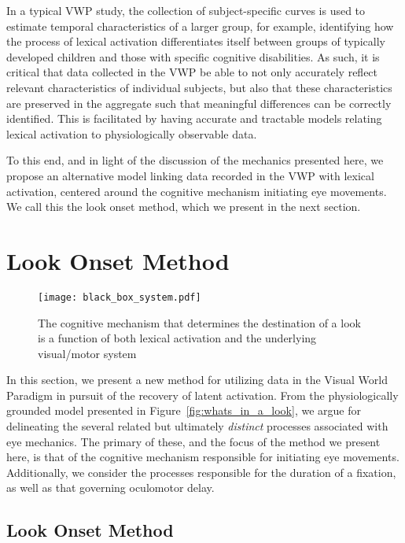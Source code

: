 In a typical VWP study, the collection of subject-specific curves is used to estimate temporal characteristics of a larger group, for example, identifying how the process of lexical activation differentiates itself between groups of typically developed children and those with specific cognitive disabilities. As such, it is critical that data collected in the VWP be able to not only accurately reflect relevant characteristics of individual subjects, but also that these characteristics are preserved in the aggregate such that meaningful differences can be correctly identified. This is facilitated by having accurate and tractable models relating lexical activation to physiologically observable data. 

To this end, and in light of the discussion of the mechanics presented here, we propose an alternative model linking data recorded in the VWP with lexical activation, centered around the cognitive mechanism initiating eye movements. We call this the look onset method, which we present in the next section.




\section{Look Onset Method}

\begin{figure}[H]
\centering
\texttt{[image: black\_box\_system.pdf]}
\caption{The cognitive mechanism that determines the destination of a look is a function of both lexical activation and the underlying visual/motor system}
\label{fig:black_box_model}
\end{figure}


In this section, we present a new method for utilizing data in the Visual World Paradigm in pursuit of the recovery of latent activation. From the physiologically grounded model presented in Figure~\ref{fig:whats_in_a_look}, we argue for delineating the several related but ultimately \emph{distinct} processes associated with eye mechanics. The primary of these, and the focus of the method we present here, is that of the cognitive mechanism responsible for initiating eye movements. Additionally, we consider the processes responsible for the duration of a fixation, as well as that governing oculomotor delay.

\subsection{Look Onset Method}

